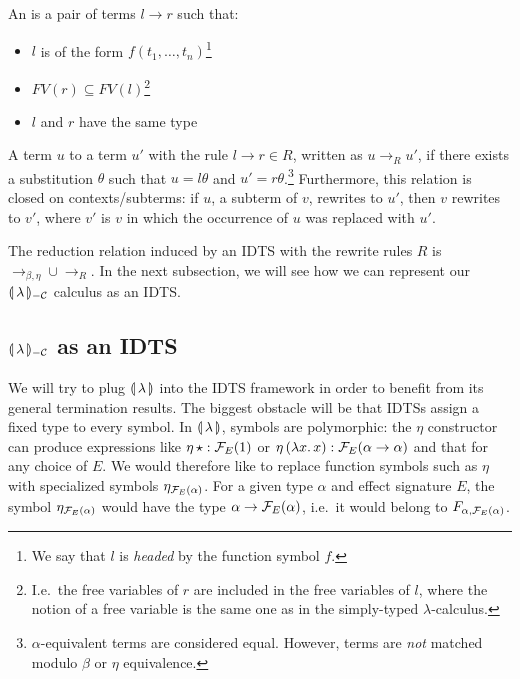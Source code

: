 \begin{definition}
  An  is a pair of terms $l \to r$ such that:
  \begin{itemize}
  \item $l$ is of the form $f(t_1,\ldots,t_n)$\footnote{We say that $l$ is
      \emph{headed} by the function symbol $f$.}
  \item $FV(r) \subseteq FV(l)$\footnote{I.e.\ the free variables of $r$
      are included in the free variables of $l$, where the notion of a free
      variable is the same one as in the simply-typed $\lambda$-calculus.}
  \item $l$ and $r$ have the same type
  \end{itemize}
\end{definition}

\begin{definition}
  A term $u$  to a term $u'$ with the rule
  $l \to r \in R$, written as $u \to_R u'$, if there exists a substitution
  $\theta$ such that $u = l\theta$ and
  $u' = r\theta$.\footnote{$\alpha$-equivalent terms are considered
    equal. However, terms are \emph{not} matched modulo $\beta$ or $\eta$
    equivalence.} Furthermore, this relation is closed on
  contexts/subterms: if $u$, a subterm of $v$, rewrites to $u'$, then $v$
  rewrites to $v'$, where $v'$ is $v$ in which the occurrence of $u$ was
  replaced with $u'$.
\end{definition}

The reduction relation induced by an IDTS with the rewrite rules $R$ is
$\to_{\beta,\eta} \cup \to_R$. In the next subsection, we will see how we
can represent our ${\llparenthesis \, \lambda \, \rrparenthesis_{-\mathcal{C}}}$ calculus as an IDTS.


\subsection{\texorpdfstring{${\llparenthesis \, \lambda \, \rrparenthesis_{-\mathcal{C}}}$}{Our Calculus} as an IDTS}
\label{ssec:banana-idts}

We will try to plug $\llparenthesis \, \lambda \, \rrparenthesis$ into the IDTS framework in order to
benefit from its general termination results. The biggest obstacle will be
that IDTSs assign a fixed type to every symbol. In $\llparenthesis \, \lambda \, \rrparenthesis$,
symbols are polymorphic: the $\eta$ constructor can produce expressions
like $\eta\,\star : \mathcal{F}_E(1)$ or
$\eta\,(\lambda x.\, x) : \mathcal{F}_E(\alpha \to \alpha)$ and that for any choice of
$E$. We would therefore like to replace function symbols such as $\eta$
with specialized symbols $\eta_{\mathcal{F}_E(\alpha)}$. For a given type $\alpha$
and effect signature $E$, the symbol $\eta_{\mathcal{F}_E(\alpha)}$ would have the
type $\alpha \to \mathcal{F}_E(\alpha)$, i.e.\ it would belong to
$F_{\alpha,\mathcal{F}_E(\alpha)}$.

